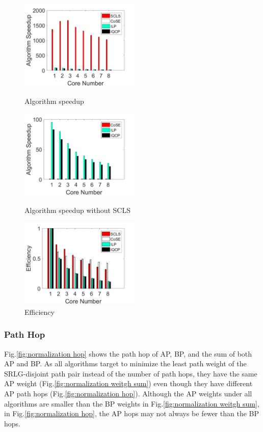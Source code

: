 \begin{figure}[tp]
\centering
\begin{minipage}[t]{0.3\linewidth}
\centering
\includegraphics[width=2.25in]{figures/Multiple}
\caption{Algorithm speedup}
\label{fig:Multiple}
\end{minipage}
\hfill
\begin{minipage}[t]{0.3\linewidth}
\centering
\includegraphics[width=2.25in]{figures/MultipleNoSCLS}
\caption{Algorithm speedup without SCLS}
\label{fig:MultipleNoSCLS}
\end{minipage}
\hfill
\begin{minipage}[t]{0.3\linewidth}
\centering
\includegraphics[width=2.25in]{figures/Efficiency}
 \caption{Efficiency}
 \label{fig:Efficiency}
\end{minipage}
\end{figure}



\subsubsection{Path Hop}
Fig.\ref{fig:normalization hop} shows the path hop of AP, BP, and the sum of both AP and BP. As all algorithms target to minimize the least path weight of the SRLG-disjoint path pair instead of the number of path hops, they have the same AP weight (Fig.\ref{fig:normalization weitgh sum}) even though they have different AP path hops (Fig.\ref{fig:normalization hop}). Although the AP weights under all algorithms are smaller than the BP weights in Fig.\ref{fig:normalization weitgh sum}, in Fig.\ref{fig:normalization hop}, the AP hops may not always be fewer than the BP hops.

